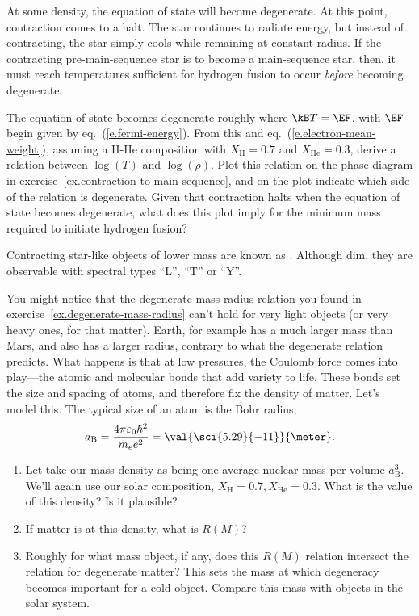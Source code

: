 At some density, the equation of state will become degenerate. At this point, contraction comes to a halt. The star continues to radiate energy, but instead of contracting, the star simply cools while remaining at constant radius. If the contracting pre-main-sequence star is to become a main-sequence star, then, it must reach temperatures sufficient for hydrogen fusion to occur \emph{before} becoming degenerate.

\begin{exercisebox}
\label{ex.minimum-stellar-mass}
The equation of state becomes degenerate roughly where $\kB T=\EF$, with $\EF$ begin given by eq.~(\ref{e.fermi-energy}). From this and eq.~(\ref{e.electron-mean-weight}), assuming a H-He composition with $X_{\mathrm{H}} = 0.7$ and $X_{\mathrm{He}}=0.3$, derive a relation between $\log(T)$ and $\log(\rho)$. Plot this relation on the phase diagram in exercise~\ref{ex.contraction-to-main-sequence}, and on the plot indicate which side of the relation is degenerate.
Given that contraction halts when the equation of state becomes degenerate, what does this plot imply for the minimum mass required to initiate hydrogen fusion?
\end{exercisebox}

 Contracting star-like objects of lower mass are known as . Although dim, they are observable with spectral types ``L'', ``T'' or ``Y''\cite{Kirkpatrick1999Dwarfs-Cooler-t,Cushing2011The-Discovery-o}.

\begin{exercisebox}
\label{ex.planetary-M-and-R}
You might notice that the degenerate mass-radius relation you found in exercise~\ref{ex.degenerate-mass-radius} can't hold for very light objects (or very heavy ones, for that matter). Earth, for example has a much larger mass than Mars, and also has a larger radius, contrary to what the degenerate relation predicts. What happens is that at low pressures, the Coulomb force comes into play---the atomic and molecular bonds that add variety to life. These bonds set the size and spacing of atoms, and therefore fix the density of matter. Let's model this. The typical size of an atom is the Bohr radius,
\[
	a_{\mathrm{B}} = \frac{4\pi\varepsilon_{0}\hbar^{2}}{m_{e}e^{2}} = \val{\sci{5.29}{-11}}{\meter}.
\]
	\begin{enumerate}
	\item Let take our mass density as being one average nuclear mass per volume $a_{\mathrm{B}}^{3}$.  We'll again use our solar composition, $X_{\mathrm{H}}=0.7, X_{\mathrm{He}}=0.3$.
What is the value of this density? Is it plausible?
	\item If matter is at this density, what is $R(M)$?
	\item Roughly for what mass object, if any, does this $R(M)$ relation intersect the relation for degenerate matter? This sets the mass at which degeneracy becomes important for a cold object. Compare this mass with objects in the solar system.
	\end{enumerate}
\end{exercisebox}

